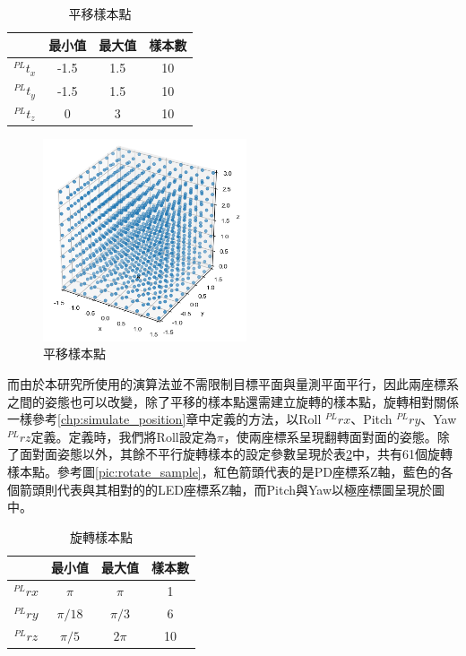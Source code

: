 \begin{table}[h!]
    \begin{center}
      \caption{平移樣本點}
      \label{tab:translate}
      \begin{tabular}{c|c|c|c} %
         & \textbf{最小值} & \textbf{最大值}&\textbf{樣本數}\\
        \hline
        $^{PL}t_x$ & -1.5 & 1.5&10\\
        $^{PL}t_y$ & -1.5 & 1.5&10\\
        $^{PL}t_z$ & 0 & 3 &10\\
      \end{tabular}
    \end{center}
  \end{table}

\begin{figure}[ht]
    \centering
    \includegraphics[width=6cm]{ch4pic/translate_sample.png}
    \caption{平移樣本點}
    \label{pic:translate_sample}
\end{figure}

而由於本研究所使用的演算法並不需限制目標平面與量測平面平行，因此兩座標系之間的姿態也可以改變，除了平移的樣本點還需建立旋轉的樣本點，旋轉相對關係一樣參考\ref{chp:simulate_position}章中定義的方法，以Roll $^{PL}rx$、Pitch $^{PL}ry$、Yaw$^{PL}rz$定義。定義時，我們將Roll設定為$\pi$，使兩座標系呈現翻轉面對面的姿態。除了面對面姿態以外，其餘不平行旋轉樣本的設定參數呈現於表\ref{tab:rotate}中，共有61個旋轉樣本點。參考圖\ref{pic:rotate_sample}，紅色箭頭代表的是PD座標系Z軸，藍色的各個箭頭則代表與其相對的的LED座標系Z軸，而Pitch與Yaw以極座標圖呈現於圖中。



\begin{table}[h]
    \begin{center}
      \caption{旋轉樣本點}
      \label{tab:rotate}
      \begin{tabular}{c|c|c|c} %
        & \textbf{最小值} & \textbf{最大值}&\textbf{樣本數}\\
       \hline
       $^{PL}rx$ & $\pi$ & $\pi$&1\\
       $^{PL}ry$ & $\pi/18$ &$\pi/3$&6\\
       $^{PL}rz$ & $\pi/5$ & $2\pi$&10\\
     \end{tabular}
   \end{center}
 \end{table}

